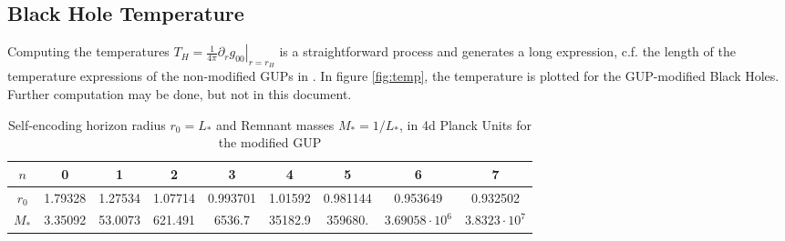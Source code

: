 \documentclass[10pt,a4paper]{article}
\begin{document}
\subsection{Black Hole Temperature}
Computing the temperatures $T_H = \frac{1}{4\pi}\left.\partial_r g_{00}\right|_{r=r_H}$ is
a straightforward process and generates a long expression, c.f. the length of the
temperature expressions of the non-modified GUPs in \cite{work}.
In figure \ref{fig:temp}, the temperature is plotted for the GUP-modified Black Holes. Further
computation may be done, but not in this document.

\begin{table}[h]
\begin{center}
\begin{tabular}{ccccccccc}
\firsthline
 $n$ & 0 & 1 & 2 & 3 & 4 & 5 & 6 & 7 \\
   \hline
 $r_0$ & 1.79328 & 1.27534 & 1.07714 & 0.993701 & 1.01592 & 0.981144 & 0.953649 & 0.932502 \\
 $M_*$ & 3.35092 & 53.0073 & 621.491 & 6536.7 & 35182.9 & 359680. & $3.69058 \cdot 10^6$ &
   $3.8323\cdot 10^7$ \\
   \hline
\end{tabular}
\end{center}
\caption{Self-encoding horizon radius $r_0=L_*$ and Remnant masses $M_* = 1/L_*$, in 4d Planck Units for the modified GUP}\label{table:Length-scales}
\end{table}
\end{document}
